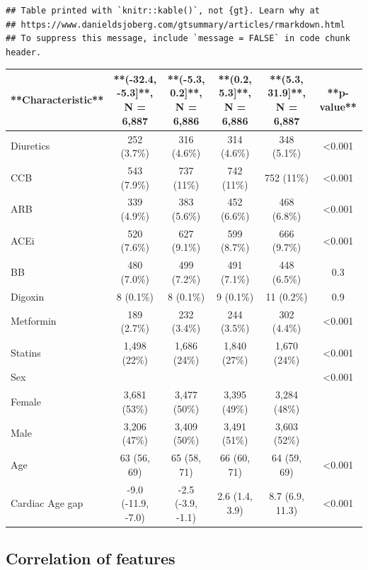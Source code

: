 \documentclass[
]{article}
\begin{document}
\begin{verbatim}
## Table printed with `knitr::kable()`, not {gt}. Learn why at
## https://www.danieldsjoberg.com/gtsummary/articles/rmarkdown.html
## To suppress this message, include `message = FALSE` in code chunk header.
\end{verbatim}

\begin{tabular}{l|c|c|c|c|c}
\hline
**Characteristic** & **(-32.4, -5.3]**, N = 6,887 & **(-5.3, 0.2]**, N = 6,886 & **(0.2, 5.3]**, N = 6,886 & **(5.3, 31.9]**, N = 6,887 & **p-value**\\
\hline
Diuretics & 252 (3.7\%) & 316 (4.6\%) & 314 (4.6\%) & 348 (5.1\%) & <0.001\\
\hline
CCB & 543 (7.9\%) & 737 (11\%) & 742 (11\%) & 752 (11\%) & <0.001\\
\hline
ARB & 339 (4.9\%) & 383 (5.6\%) & 452 (6.6\%) & 468 (6.8\%) & <0.001\\
\hline
ACEi & 520 (7.6\%) & 627 (9.1\%) & 599 (8.7\%) & 666 (9.7\%) & <0.001\\
\hline
BB & 480 (7.0\%) & 499 (7.2\%) & 491 (7.1\%) & 448 (6.5\%) & 0.3\\
\hline
Digoxin & 8 (0.1\%) & 8 (0.1\%) & 9 (0.1\%) & 11 (0.2\%) & 0.9\\
\hline
Metformin & 189 (2.7\%) & 232 (3.4\%) & 244 (3.5\%) & 302 (4.4\%) & <0.001\\
\hline
Statins & 1,498 (22\%) & 1,686 (24\%) & 1,840 (27\%) & 1,670 (24\%) & <0.001\\
\hline
Sex &  &  &  &  & <0.001\\
\hline
Female & 3,681 (53\%) & 3,477 (50\%) & 3,395 (49\%) & 3,284 (48\%) & \\
\hline
Male & 3,206 (47\%) & 3,409 (50\%) & 3,491 (51\%) & 3,603 (52\%) & \\
\hline
Age & 63 (56, 69) & 65 (58, 71) & 66 (60, 71) & 64 (59, 69) & <0.001\\
\hline
Cardiac Age gap & -9.0 (-11.9, -7.0) & -2.5 (-3.9, -1.1) & 2.6 (1.4, 3.9) & 8.7 (6.9, 11.3) & <0.001\\
\hline
\end{tabular}

\hypertarget{correlation-of-features}{%
\subsection{Correlation of features}\label{correlation-of-features}}
\end{document}

